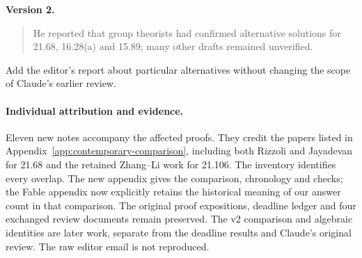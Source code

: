 \noindent\textbf{Version 2.}
\begin{quote}\small
He reported that group theorists had confirmed alternative
solutions for 21.68, 16.28(a) and 15.89; many other drafts remained
unverified.
\end{quote}

Add the editor's report about particular alternatives without changing the scope of Claude's earlier review.


\paragraph{Individual attribution and evidence.}
Eleven new notes accompany the affected proofs. They credit the papers
listed in Appendix~\ref{app:contemporary-comparison}, including both
Rizzoli and Jayadevan for 21.68 and the retained Zhang--Li work for
21.106. The inventory identifies every overlap. The new appendix gives
the comparison, chronology and checks; the Fable appendix now explicitly
retains the historical meaning of our answer count in that comparison.
The original proof expositions, deadline ledger and four exchanged
review documents remain preserved. The v2 comparison and algebraic
identities are later work, separate from the deadline results and
Claude's original review. The raw editor email is not reproduced.
